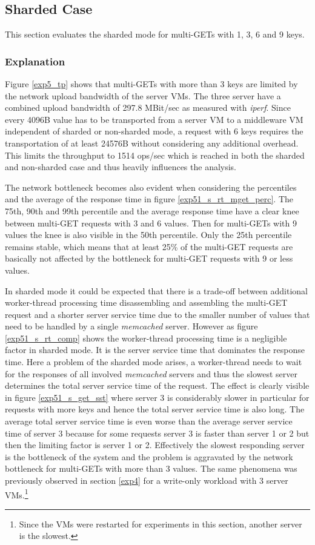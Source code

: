 \documentclass[report.tex]{subfiles}
\begin{document}
\subsection{Sharded Case}

This section evaluates the sharded mode for multi-GETs with 1, 3, 6 and 9 keys.

\subsubsection{Explanation}

Figure \ref{exp5_tp} shows that multi-GETs with more than 3 keys are limited by the network upload bandwidth of the server VMs. The three server have a combined upload bandwidth of 297.8 MBit/sec as measured with \emph{iperf}. Since every 4096B value has to be transported from a server VM to a middleware VM independent of sharded or non-sharded mode, a request with 6 keys requires the transportation of at least 24576B without considering any additional overhead. This limits the throughput to 1514 ops/sec which is reached in both the sharded and non-sharded case and thus heavily influences the analysis.

The network bottleneck becomes also evident when considering the percentiles and the average of the response time in figure \ref{exp51_s_rt_mget_perc}. The 75th, 90th and 99th percentile and the average response time have a clear knee between multi-GET requests with 3 and 6 values. Then for multi-GETs with 9 values the knee is also visible in the 50th percentile. Only the 25th percentile remains stable, which means that at least 25\% of the multi-GET requests are basically not affected by the bottleneck for multi-GET requests with 9 or less values.

In sharded mode it could be expected that there is a trade-off between additional worker-thread processing time disassembling and assembling the multi-GET request and a shorter server service time due to the smaller number of values that need to be handled by a single \emph{memcached} server. However as figure \ref{exp51_s_rt_comp} shows the worker-thread processing time is a negligible factor in sharded mode. It is the server service time that dominates the response time. Here a problem of the sharded mode arises, a worker-thread needs to wait for the responses of all involved \emph{memcached} servers and thus the slowest server determines the total server service time of the request.  The effect is clearly visible in figure \ref{exp51_s_get_sst} where server 3 is considerably slower in particular for requests with more keys and hence the total server service time is also long. The average total server service time is even worse than the average server service time of server 3 because for some requests server 3 is faster than server 1 or 2 but then the limiting factor is server 1 or 2. Effectively the slowest responding server is the bottleneck of the system and the problem is aggravated by the network bottleneck for multi-GETs with more than 3 values.
The same phenomena was previously observed in section \ref{exp4} for a write-only workload with 3 server VMs.\footnote{Since the VMs were restarted for experiments in this section, another server is the slowest.}
\end{document}
